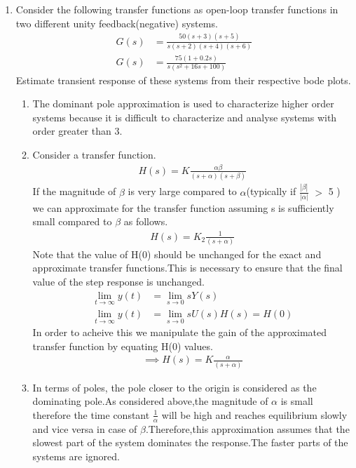 \begin{enumerate}[label=\thesubsection.\arabic*.,ref=\thesubsection.\theenumi]

\item Consider the following transfer functions as open-loop transfer functions in two different unity feedback(negative) systems.
\begin{align}
G(s) &= \frac{50(s+3)(s+5)}{s(s+2)(s+4)(s+6)} 
\\
G(s) &= \frac{75(1+0.2s)}{s(s^{2}+16s+100)} 
\end{align}
Estimate transient response of these systems from their respective bode plots.
\\
\solution 
\begin{enumerate}
\item  The dominant pole approximation is used to characterize higher order systems because it is difficult to characterize and analyse systems with order greater than 3.
\item Consider a transfer function.
\begin{align}
H(s) = K\frac{\alpha\beta}{(s+\alpha)(s+\beta)}
\end{align}
If the magnitude of $\beta$ is very large compared to $\alpha$(typically if $\frac{|\beta|}{|\alpha|}$ $>$ 5  ) we can approximate for the transfer function assuming s is sufficiently small compared to $\beta$ as follows.
\begin{align}
H(s) = K_{2}\frac{1}{(s+\alpha)}
\end{align}
Note that the value of H(0) should be unchanged for the exact and approximate transfer functions.This is necessary to ensure that the final value of the step response is unchanged.
\begin{align}
\lim_{t\to\infty} y(t) &= \lim_{s\to 0} sY(s) \\
\lim_{t\to\infty} y(t) &= \lim_{s\to 0} sU(s)H(s) = H(0)
\end{align}
In order to acheive this we manipulate the gain of the approximated transfer function by equating H(0) values.
\begin{align}
\implies H(s) = K\frac{\alpha}{(s+\alpha)}
\end{align}
\item In terms of poles, the pole closer to the origin is considered as the dominating pole.As considered above,the magnitude of $\alpha$ is small therefore the time constant $\frac{1}{\alpha}$ will be high and reaches equilibrium slowly and vice versa in case of  $\beta$.Therefore,this approximation assumes that the slowest part of the system dominates the response.The faster parts of the systems are ignored.

\end{enumerate}
\end{enumerate}
